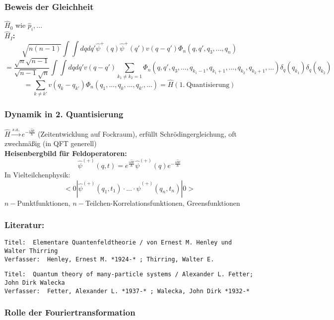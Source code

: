\documentclass[twoside,a4paper]{scrartcl}
\renewcommand{\1}{\mathds{1}}
\newcommand{\ra}{\rightarrow}
\begin{document}
\subsubsection*{Beweis der Gleichheit}
$\hat H_0$ wie $\hat p_i,...$\\
\textbf{$\hat H_I$:}\\
$$\sqrt{n(n-1)} \int \int dq dq' \hat \psi^+(q) \hat \psi^+(q') v(q-q') \Phi_n(q,q',q_3,...,q_n)$$
$$=\frac{\sqrt{n}\sqrt{n-1}}{\sqrt{n-1}\sqrt{n}}\int \int dq dq'  v(q-q') \sum_{k_1\neq k_2=1} \Phi_n(q,q',q_3,...,q_{k_1-1},q_{k_1+1},...,q_{k_2},q_{k_2+1},...) \delta_q(q_{k_1})\delta_q(q_{k_2})$$
$$=\sum_{k\neq k'} v(q_k-q_{k'})\Phi_n(q_1,...,q_k,...,q_{k'},...)=\hat H(1. \ \mathrm{Quantisierung})$$

\subsubsection*{Dynamik in 2. Quantisierung}
$\hat H \stackrel{s.a.}{\ra} e^{-\frac{i\hat H t}{\hbar}}$ (Zeitentwicklung auf Fockraum), erfüllt Schrödingergleichung, oft zwechmäßig (in QFT generell)\\
\textbf{Heisenbergbild für Feldoperatoren:}\\
$$\hat \psi^{(+)}(q,t)=e^{\frac{i\hat H t}{\hbar}} \hat \psi^{(+)}(q)e^{-\frac{i\hat H t}{\hbar}}$$
In Vielteilchenphysik:
$$<0|\hat\psi^{(+)}(q_1,t_1)\cdot ... \cdot\hat\psi^{(+)}(q_n,t_n)|0> $$
$n-$Punktfunktionen, $n-$Teilchen-Korrelationsfunktionen, Greensfunktionen\\
\subsubsection*{Literatur:}
\begin{tiny}
\begin{verbatim}
Titel: 	Elementare Quantenfeldtheorie / von Ernest M. Henley und Walter Thirring
Verfasser: 	Henley, Ernest M. *1924-* ; Thirring, Walter E.
\end{verbatim}
\end{tiny}


\begin{tiny}
\begin{verbatim}
Titel: 	Quantum theory of many-particle systems / Alexander L. Fetter; John Dirk Walecka
Verfasser: 	Fetter, Alexander L. *1937-* ; Walecka, John Dirk *1932-*
\end{verbatim}
\end{tiny}

\subsubsection*{Rolle der Fouriertransformation}
\end{document}
